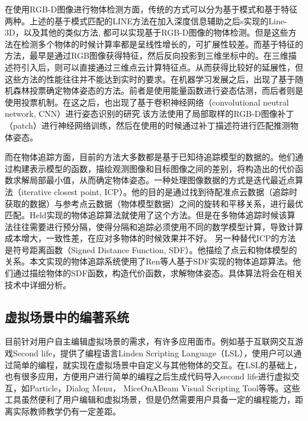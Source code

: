 在使用RGB-D图像进行物体检测方面，传统的方式可以分为基于模式和基于特征两种。上述的基于模式匹配的LINE方法\cite{hinterstoisser2011gradient}在加入深度信息辅助之后s实现的Line-3D，以及其他的类似方法\cite{kehl2016hashmod, rios2013discriminatively}, 都可以实现基于RGB-D图像的物体检测。但是这些方法在检测多个物体的时候计算率都是呈线性增长的，可扩展性较差。而基于特征的方法，最早是通过RGB图像获得特征\cite{lowe2004distinctive}，然后反向投影到三维坐标中的\cite{lowe2001local}。在三维描述符引入后，则可以直接通过三维点云计算特征点\cite{mian2010repeatability}。从而获得比较好的延展性，但这些方法的性能往往并不能达到实时的要求。在机器学习发展之后，出现了基于随机森林投票确定物体姿态的方法。\cite{brachmann2016uncertainty, tejani2014latent}前者是使用能量函数进行姿态估测，而后者则是使用投票机制。在这之后，也出现了基于卷积神经网络（convolutional neutral network, CNN）进行姿态识别的研究\cite{kehl2016deep}.该方法使用了局部取样的RGB-D图像补丁（patch）进行神经网络训练，然后在使用的时候通过补丁描述符进行匹配推测物体姿态。

而在物体追踪方面，目前的方法大多数都是基于已知待追踪模型的数据的。他们通过构建表示模型的函数，描绘观测图像和目标图像之间的差别，将构造出的代价函数求解局部最小值，从而确定物体姿态。一种处理图像数据的方式是迭代最近点算法（iterative closest point, ICP）。他的目的是通过找到待配准点云数据（追踪时获取的数据）与参考点云数据（物体模型数据）之间的旋转和平移关系，进行最优匹配。Held实现的物体追踪算法就使用了这个方法。\cite{held20123d}但是在多物体追踪时候该算法往往需要进行预分隔，使得分隔和追踪必须使用不同的数学模型计算，导致计算成本增大，一致性差，在应对多物体的时候效果并不好。
另一种替代ICP的方法是符号距离函数（Signed Distance Function, SDF）。他描绘了点云和物体模型的关系。本文实现的物体追踪系统使用了Ren等人基于SDF实现的物体追踪算法。\cite{ren2017real}他们通过描绘物体的SDF函数，构造代价函数，求解物体姿态。具体算法将会在相关技术中详细分析。

\subsection{虚拟场景中的编著系统}
目前针对用户自主编辑虚拟场景的需求，有许多应用面市。例如基于互联网交互游戏Second life，提供了编程语言Linden Scripting Language（LSL），使用户可以通过简单的编程，就实现在虚拟场景中自定义与其他物体的交互。\cite{LSLTutorial}在LSL的基础上，也有很多应用，方便用户进行简单的编程之后生成代码导入second life进行虚拟交互，如Particle，Dialog Menu， MiceOnABeam Visual Scripting Tool等等。\cite{zhong2014domain}这些工具虽然便利了用户编辑和虚拟场景，但是仍然需要用户具备一定的编程能力，距离实际教师教学仍有一定差距。

